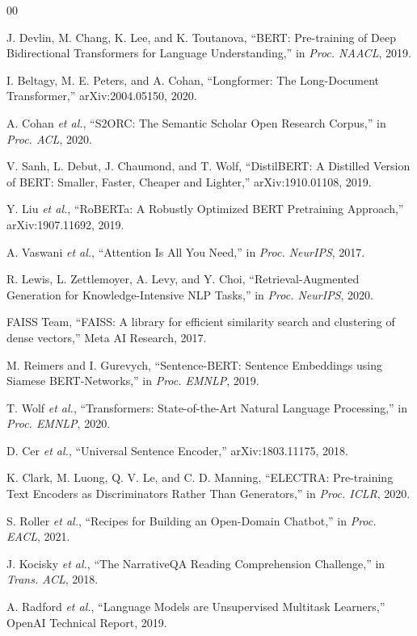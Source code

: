 \documentclass[conference]{IEEEtran}
\begin{document}
\begin{thebibliography}{00}

 J. Devlin, M. Chang, K. Lee, and K. Toutanova, 
``BERT: Pre-training of Deep Bidirectional Transformers for Language Understanding,''
in \textit{Proc. NAACL}, 2019.

 I. Beltagy, M. E. Peters, and A. Cohan,
``Longformer: The Long-Document Transformer,''
arXiv:2004.05150, 2020.

 A. Cohan \textit{et al.},
``S2ORC: The Semantic Scholar Open Research Corpus,''
in \textit{Proc. ACL}, 2020.

 V. Sanh, L. Debut, J. Chaumond, and T. Wolf,
``DistilBERT: A Distilled Version of BERT: Smaller, Faster, Cheaper and Lighter,''
arXiv:1910.01108, 2019.

 Y. Liu \textit{et al.},
``RoBERTa: A Robustly Optimized BERT Pretraining Approach,''
arXiv:1907.11692, 2019.

 A. Vaswani \textit{et al.},
``Attention Is All You Need,''
in \textit{Proc. NeurIPS}, 2017.

 R. Lewis, L. Zettlemoyer, A. Levy, and Y. Choi,
``Retrieval-Augmented Generation for Knowledge-Intensive NLP Tasks,''
in \textit{Proc. NeurIPS}, 2020.

 FAISS Team,
``FAISS: A library for efficient similarity search and clustering of dense vectors,''
Meta AI Research, 2017.

 M. Reimers and I. Gurevych,
``Sentence-BERT: Sentence Embeddings using Siamese BERT-Networks,''
in \textit{Proc. EMNLP}, 2019.

 T. Wolf \textit{et al.},
``Transformers: State-of-the-Art Natural Language Processing,''
in \textit{Proc. EMNLP}, 2020.

 D. Cer \textit{et al.},
``Universal Sentence Encoder,''
arXiv:1803.11175, 2018.

 K. Clark, M. Luong, Q. V. Le, and C. D. Manning,
``ELECTRA: Pre-training Text Encoders as Discriminators Rather Than Generators,''
in \textit{Proc. ICLR}, 2020.

 S. Roller \textit{et al.},
``Recipes for Building an Open-Domain Chatbot,''
in \textit{Proc. EACL}, 2021.

 J. Kocisky \textit{et al.},
``The NarrativeQA Reading Comprehension Challenge,''
in \textit{Trans. ACL}, 2018.

 A. Radford \textit{et al.},
``Language Models are Unsupervised Multitask Learners,''
OpenAI Technical Report, 2019.

\end{thebibliography}
\end{document}
